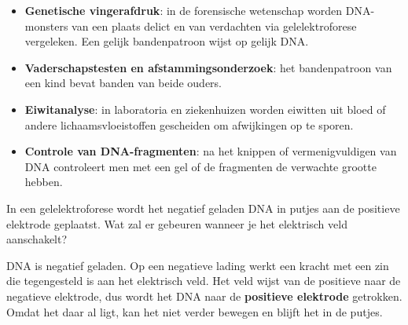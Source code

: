 \documentclass{ximera}
\begin{document}
\begin{example}[foldable=true,title={Toepassingen van elektroforese}]\nl
    \begin{itemize}
        \item \textbf{Genetische vingerafdruk}: in de forensische wetenschap worden DNA-monsters van een plaats delict en van verdachten via gelelektroforese vergeleken. Een gelijk bandenpatroon wijst op gelijk DNA.
        \item \textbf{Vaderschapstesten en afstammingsonderzoek}: het bandenpatroon van een kind bevat banden van beide ouders.
        \item \textbf{Eiwitanalyse}: in laboratoria en ziekenhuizen worden eiwitten uit bloed of andere lichaamsvloeistoffen gescheiden om afwijkingen op te sporen.
        \item \textbf{Controle van DNA-fragmenten}: na het knippen of vermenigvuldigen van DNA controleert men met een gel of de fragmenten de verwachte grootte hebben.
    \end{itemize}
\end{example}

\begin{question}
    In een gelelektroforese wordt het negatief geladen DNA in putjes aan de positieve elektrode geplaatst. Wat zal er gebeuren wanneer je het elektrisch veld aanschakelt?

    \begin{multipleChoice}
    \end{multipleChoice}

    \begin{solution}\nl
        DNA is negatief geladen. Op een negatieve lading werkt een kracht met een zin die tegengesteld is aan het elektrisch veld. Het veld wijst van de positieve naar de negatieve elektrode, dus wordt het DNA naar de \textbf{positieve elektrode} getrokken. Omdat het daar al ligt, kan het niet verder bewegen en blijft het in de putjes.
    \end{solution}
\end{question}

\end{document}
